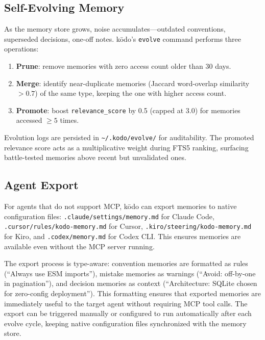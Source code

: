 \documentclass{article}
\begin{document}
\subsection{Self-Evolving Memory}
\label{sec:evolve_method}

As the memory store grows, noise accumulates---outdated conventions, superseded decisions, one-off notes. k\=odo's \texttt{evolve} command performs three operations:

\begin{enumerate}
    \item \textbf{Prune}: remove memories with zero access count older than 30 days.
    \item \textbf{Merge}: identify near-duplicate memories (Jaccard word-overlap similarity $> 0.7$) of the same type, keeping the one with higher access count.
    \item \textbf{Promote}: boost \texttt{relevance\_score} by 0.5 (capped at 3.0) for memories accessed $\geq 5$ times.
\end{enumerate}

Evolution logs are persisted in \texttt{\~{}/.kodo/evolve/} for auditability. The promoted relevance score acts as a multiplicative weight during FTS5 ranking, surfacing battle-tested memories above recent but unvalidated ones.

\subsection{Agent Export}
\label{sec:export}

For agents that do not support MCP, k\=odo can export memories to native configuration files: \texttt{.claude/settings/memory.md} for Claude Code, \texttt{.cursor/rules/kodo-memory.md} for Cursor, \texttt{.kiro/steering/kodo-memory.md} for Kiro, and \texttt{.codex/memory.md} for Codex CLI. This ensures memories are available even without the MCP server running.

The export process is type-aware: convention memories are formatted as rules (``Always use ESM imports''), mistake memories as warnings (``Avoid: off-by-one in pagination''), and decision memories as context (``Architecture: SQLite chosen for zero-config deployment''). This formatting ensures that exported memories are immediately useful to the target agent without requiring MCP tool calls. The export can be triggered manually or configured to run automatically after each evolve cycle, keeping native configuration files synchronized with the memory store.
\end{document}
